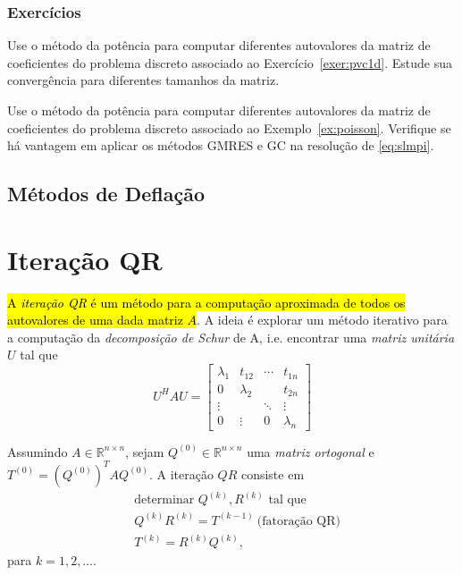 \subsubsection{Exercícios}

\begin{exer}
  Use o método da potência para computar diferentes autovalores da matriz de coeficientes do problema discreto associado ao Exercício~\ref{exer:pvc1d}. Estude sua convergência para diferentes tamanhos da matriz. 
\end{exer}

\begin{exer}
  Use o método da potência para computar diferentes autovalores da matriz de coeficientes do problema discreto associado ao Exemplo~\ref{ex:poisson}. Verifique se há vantagem em aplicar os métodos GMRES e GC na resolução de \eqref{eq:slmpi}.
\end{exer}

\subsection{Métodos de Deflação}
\badgeConstrucao

\section{Iteração QR}\label{cap_autoval_sec_qr}
\badgeRevisar

\hl{A \emph{iteração QR} é um método para a computação aproximada de todos os autovalores de uma dada matriz $A$}. A ideia é explorar um método iterativo para a computação da \emph{decomposição de Schur}{\schur} de A, i.e. encontrar uma \emph{matriz unitária} $U$ tal que
\begin{equation}
  U^{H}AU =
  \begin{bmatrix}
    \lambda_1 & t_{12} & \cdots & t_{1n}\\
    0 & \lambda_2 & & t_{2n}\\
    \vdots & & \ddots & \vdots\\
    0 & \vdots & 0 & \lambda_n
  \end{bmatrix}
\end{equation}

Assumindo $A\in\mathbb{R}^{n\times n}$, sejam $Q^{(0)}\in\mathbb{R}^{n\times n}$ uma \emph{matriz ortogonal} e $T^{(0)} = (Q^{(0)})^TAQ^{(0)}$. A iteração $QR$ consiste em
\begin{align}
  &\text{determinar }Q^{(k)}, R^{(k)}\text{ tal que}\nonumber\\
  &Q^{(k)}R^{(k)} = T^{(k-1)} ~\text{(fatoração QR)}\\
  &T^{(k)} = R^{(k)}Q^{(k)},
\end{align}
para $k=1,2,\ldots$.

